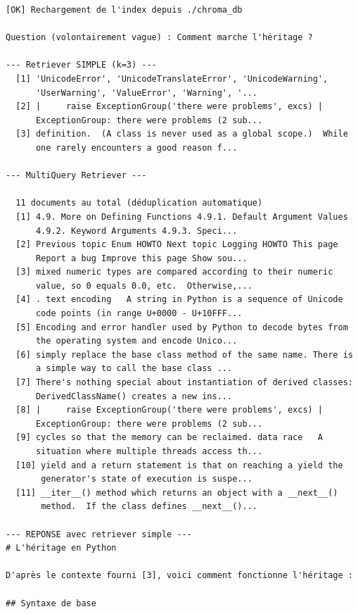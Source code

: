 \documentclass[11pt,a4paper]{article}
\begin{document}
\begin{tcolorbox}[
  colback=white,
  colframe=black!50,
  coltitle=black,
  fonttitle=\footnotesize\bfseries,
  fontupper=\footnotesize,
  title=Sortie de l'exécution,
  breakable,
]
\begin{verbatim}
[OK] Rechargement de l'index depuis ./chroma_db

Question (volontairement vague) : Comment marche l'héritage ?

--- Retriever SIMPLE (k=3) ---
  [1] 'UnicodeError', 'UnicodeTranslateError', 'UnicodeWarning',
      'UserWarning', 'ValueError', 'Warning', '...
  [2] |     raise ExceptionGroup('there were problems', excs) |
      ExceptionGroup: there were problems (2 sub...
  [3] definition.  (A class is never used as a global scope.)  While
      one rarely encounters a good reason f...

--- MultiQuery Retriever ---

  11 documents au total (déduplication automatique)
  [1] 4.9. More on Defining Functions 4.9.1. Default Argument Values
      4.9.2. Keyword Arguments 4.9.3. Speci...
  [2] Previous topic Enum HOWTO Next topic Logging HOWTO This page
      Report a bug Improve this page Show sou...
  [3] mixed numeric types are compared according to their numeric
      value, so 0 equals 0.0, etc.  Otherwise,...
  [4] . text encoding   A string in Python is a sequence of Unicode
      code points (in range U+0000 - U+10FFF...
  [5] Encoding and error handler used by Python to decode bytes from
      the operating system and encode Unico...
  [6] simply replace the base class method of the same name. There is
      a simple way to call the base class ...
  [7] There's nothing special about instantiation of derived classes:
      DerivedClassName() creates a new ins...
  [8] |     raise ExceptionGroup('there were problems', excs) |
      ExceptionGroup: there were problems (2 sub...
  [9] cycles so that the memory can be reclaimed. data race   A
      situation where multiple threads access th...
  [10] yield and a return statement is that on reaching a yield the
       generator's state of execution is suspe...
  [11] __iter__() method which returns an object with a __next__()
       method.  If the class defines __next__()...

--- REPONSE avec retriever simple ---
# L'héritage en Python

D'après le contexte fourni [3], voici comment fonctionne l'héritage :

## Syntaxe de base


\end{verbatim}
\end{tcolorbox}
\end{document}
